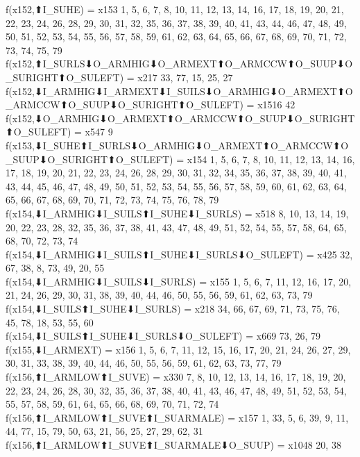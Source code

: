 f(x152,⬆I_SUHE) = x153 {1, 5, 6, 7, 8, 10, 11, 12, 13, 14, 16, 17, 18, 19, 20, 21, 22, 23, 24, 26, 28, 29, 30, 31, 32, 35, 36, 37, 38, 39, 40, 41, 43, 44, 46, 47, 48, 49, 50, 51, 52, 53, 54, 55, 56, 57, 58, 59, 61, 62, 63, 64, 65, 66, 67, 68, 69, 70, 71, 72, 73, 74, 75, 79} \\
f(x152,⬆I_SURLS⬇O_ARMHIG⬇O_ARMEXT⬆O_ARMCCW⬆O_SUUP⬇O_SURIGHT⬆O_SULEFT) = x217 {33, 77, 15, 25, 27} \\
f(x152,⬇I_ARMHIG⬇I_ARMEXT⬇I_SUILS⬇O_ARMHIG⬇O_ARMEXT⬆O_ARMCCW⬆O_SUUP⬇O_SURIGHT⬆O_SULEFT) = x1516 {42} \\
f(x152,⬇O_ARMHIG⬇O_ARMEXT⬆O_ARMCCW⬆O_SUUP⬇O_SURIGHT⬆O_SULEFT) = x547 {9} \\
f(x153,⬇I_SUHE⬆I_SURLS⬇O_ARMHIG⬇O_ARMEXT⬆O_ARMCCW⬆O_SUUP⬇O_SURIGHT⬆O_SULEFT) = x154 {1, 5, 6, 7, 8, 10, 11, 12, 13, 14, 16, 17, 18, 19, 20, 21, 22, 23, 24, 26, 28, 29, 30, 31, 32, 34, 35, 36, 37, 38, 39, 40, 41, 43, 44, 45, 46, 47, 48, 49, 50, 51, 52, 53, 54, 55, 56, 57, 58, 59, 60, 61, 62, 63, 64, 65, 66, 67, 68, 69, 70, 71, 72, 73, 74, 75, 76, 78, 79} \\
f(x154,⬇I_ARMHIG⬇I_SUILS⬆I_SUHE⬇I_SURLS) = x518 {8, 10, 13, 14, 19, 20, 22, 23, 28, 32, 35, 36, 37, 38, 41, 43, 47, 48, 49, 51, 52, 54, 55, 57, 58, 64, 65, 68, 70, 72, 73, 74} \\
f(x154,⬇I_ARMHIG⬇I_SUILS⬆I_SUHE⬇I_SURLS⬇O_SULEFT) = x425 {32, 67, 38, 8, 73, 49, 20, 55} \\
f(x154,⬇I_ARMHIG⬇I_SUILS⬇I_SURLS) = x155 {1, 5, 6, 7, 11, 12, 16, 17, 20, 21, 24, 26, 29, 30, 31, 38, 39, 40, 44, 46, 50, 55, 56, 59, 61, 62, 63, 73, 79} \\
f(x154,⬇I_SUILS⬆I_SUHE⬇I_SURLS) = x218 {34, 66, 67, 69, 71, 73, 75, 76, 45, 78, 18, 53, 55, 60} \\
f(x154,⬇I_SUILS⬆I_SUHE⬇I_SURLS⬇O_SULEFT) = x669 {73, 26, 79} \\
f(x155,⬇I_ARMEXT) = x156 {1, 5, 6, 7, 11, 12, 15, 16, 17, 20, 21, 24, 26, 27, 29, 30, 31, 33, 38, 39, 40, 44, 46, 50, 55, 56, 59, 61, 62, 63, 73, 77, 79} \\
f(x156,⬆I_ARMLOW⬆I_SUVE) = x330 {7, 8, 10, 12, 13, 14, 16, 17, 18, 19, 20, 22, 23, 24, 26, 28, 30, 32, 35, 36, 37, 38, 40, 41, 43, 46, 47, 48, 49, 51, 52, 53, 54, 55, 57, 58, 59, 61, 64, 65, 66, 68, 69, 70, 71, 72, 74} \\
f(x156,⬆I_ARMLOW⬆I_SUVE⬆I_SUARMALE) = x157 {1, 33, 5, 6, 39, 9, 11, 44, 77, 15, 79, 50, 63, 21, 56, 25, 27, 29, 62, 31} \\
f(x156,⬆I_ARMLOW⬆I_SUVE⬆I_SUARMALE⬇O_SUUP) = x1048 {20, 38} \\
